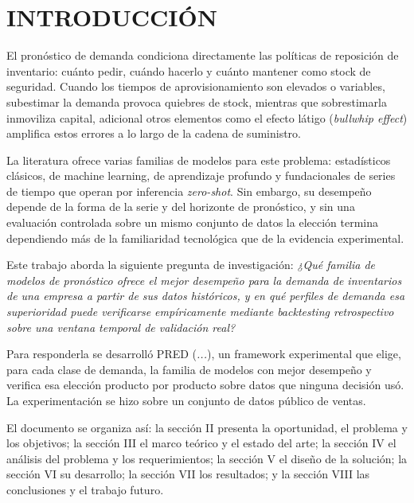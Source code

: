 \section{INTRODUCCIÓN}
El pronóstico de demanda condiciona directamente las políticas de reposición de inventario: cuánto pedir, cuándo hacerlo y cuánto mantener como stock de seguridad. Cuando los tiempos de aprovisionamiento son elevados o variables, subestimar la demanda provoca quiebres de stock, mientras que sobrestimarla inmoviliza capital, adicional otros elementos como el efecto látigo (\textit{bullwhip effect}) amplifica estos errores a lo largo de la cadena de suministro.

La literatura ofrece varias familias de modelos para este problema: estadísticos clásicos, de machine learning, de aprendizaje profundo y fundacionales de series de tiempo que operan por inferencia \textit{zero-shot}. Sin embargo, su desempeño depende de la forma de la serie y del horizonte de pronóstico, y sin una evaluación controlada sobre un mismo conjunto de datos la elección termina dependiendo más de la familiaridad tecnológica que de la evidencia experimental.

Este trabajo aborda la siguiente pregunta de investigación: \textit{¿Qué familia de modelos de pronóstico ofrece el mejor desempeño para la demanda de inventarios de una empresa a partir de sus datos históricos, y en qué perfiles de demanda esa superioridad puede verificarse empíricamente mediante backtesting retrospectivo sobre una ventana temporal de validación real?}

Para responderla se desarrolló PRED (\textit{...}), un framework experimental que elige, para cada clase de demanda, la familia de modelos con mejor desempeño y verifica esa elección producto por producto sobre datos que ninguna decisión usó. La experimentación se hizo sobre un conjunto de datos público de ventas.

El documento se organiza así: la sección II presenta la oportunidad, el problema y los objetivos; la sección III el marco teórico y el estado del arte; la sección IV el análisis del problema y los requerimientos; la sección V el diseño de la solución; la sección VI su desarrollo; la sección VII los resultados; y la sección VIII las conclusiones y el trabajo futuro.